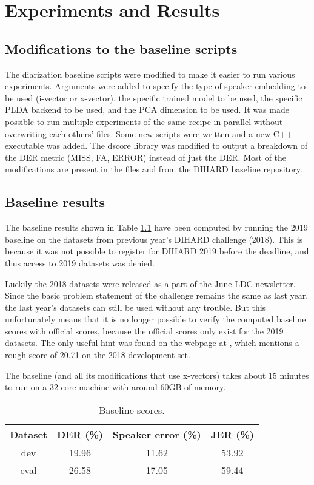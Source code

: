 \chapter{Experiments and Results}
	\section{Modifications to the baseline scripts}
	The diarization baseline scripts were modified to make it easier to run various experiments. Arguments were added to specify the type of speaker embedding to be used (i-vector or x-vector), the specific trained model to be used, the specific PLDA backend to be used, and the PCA dimension to be used. It was made possible to run multiple experiments of the same recipe in parallel without overwriting each others' files. Some new scripts were written and a new C++ executable was added. The dscore library was modified to output a breakdown of the DER metric (MISS, FA, ERROR) instead of just the DER. Most of the modifications are present in the files  and  from the DIHARD baseline repository.
	
	\section{Baseline results}
	The baseline results shown in Table \ref{table-baseline-scores} have been computed by running the 2019 baseline on the datasets from previous year's DIHARD challenge (2018). This is because it was not possible to register for DIHARD 2019 before the deadline, and thus access to 2019 datasets was denied.
	
	Luckily the 2018 datasets were released as a part of the June LDC newsletter. Since the basic problem statement of the challenge remains the same as last year, the last year's datasets can still be used without any trouble. But this unfortunately means that it is no longer possible to verify the computed baseline scores with official scores, because the official scores only exist for the 2019 datasets. The only useful hint was found on the webpage at \cite{dihard2-unofficial}, which mentions a rough score of 20.71 on the 2018 development set.
	
	The baseline (and all its modifications that use x-vectors) takes about 15 minutes to run on a 32-core machine with around 60GB of memory.
	
	\begin{table}[h]
		\centering
		\begin{tabular}{|c|c|c|c|}
			\hline
			Dataset & DER (\%) & Speaker error (\%) & JER (\%) \\
			\hline
			dev & 19.96 & 11.62 & 53.92 \\
			\hline
			eval & 26.58 & 17.05 & 59.44 \\
			\hline
		\end{tabular}
	\caption{Baseline scores.}
	\label{table-baseline-scores}
	\end{table}
	
